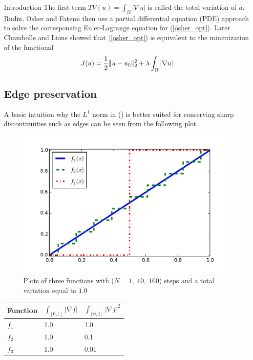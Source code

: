 \begin{chapter}{Introduction}
The first term $TV(u)=\int_\Omega\left\vert\nabla u\right\vert$ is called the total variation of $u$. Rudin, Osher and Fatemi then use a partial differential equation (PDE) approach to solve
the corresponsing Euler-Lagrange equation for (\ref{osher_opt}). Later Chambolle and Lions \cite{ChambolleLions} showed that (\ref{osher_opt}) is equivalent to the minimization of
the functional
\begin{equation}
    \label{osher_func}
    J(u)=\frac{1}{2}\| u-u_0 \|_2^2 +\lambda \int_\Omega\left\vert\nabla u\right\vert
\end{equation}

\subsection{Edge preservation} %
\label{sub:Edge preservation}
A basic intuition why the $L^1$ norm in (\cite{RudinOsher}) is better suited for conserving sharp discontinuities such as edges can be seen from the following plot.\\

\begin{figure}[h!]
        \centering
	    \includegraphics[width=0.9\linewidth]{./figures/introduction/tv12comparison.pdf}
	\caption[Comparison total variation]{Plots of three functions with ($N=1,\;10,\;100$) steps and a total variation equal to $1.0$}
	\label{fig:tv12comparison}
\end{figure}
\begin{table}[h!]
\centering
\begin{tabular}{|l|l|l|}
    \hline
    \textbf{Function} & $\int_{[0,1]}\left\vert\nabla f\right\vert$ & $\int_{[0,1]}\left\vert\nabla f\right\vert^2$ \\
    \hline
    $f_1$ & 1.0 & 1.0 \\
    $f_2$ & 1.0 & 0.1 \\
    $f_3$ & 1.0 & 0.01 \\
    \hline
\end{tabular}
\end{table}


\end{chapter}
